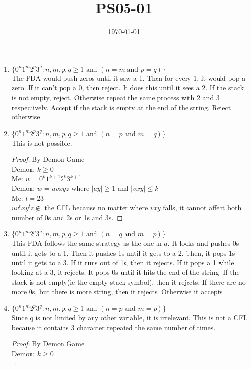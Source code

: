 \documentclass{article}
\title{PS05-01}
\date{\today}
\begin{document}
\maketitle
\begin{enumerate}[label=\alph*.]
\item $\{0^n1^m2^p3^q :n,m,p,q \geq 1 \text{ and } (n=m \text{ and } p= q)\}$\\
The PDA would push zeros until it saw a 1. Then for every 1, it would pop a zero. If it can't pop a 0, then reject. It does this until it sees a 2. If the stack is not empty, reject. Otherwise repeat the same process with 2 and 3 respectively. Accept if the stack is empty at the end of the string. Reject otherwise
\item $\{0^n1^m2^p3^q :n,m,p,q \geq 1 \text{ and } (n=p \text{ and } m= q)\}$\\
This is not possible.
\begin{proof}
By Demon Game\\
Demon: $k \geq 0$\\
Me: $w = 0^k1^{k+1}2^k3^{k+1}$\\
Demon: $w = uvxyz$ where $\lvert uy\rvert \geq 1$ and $\lvert vxy\rvert \leq k$\\
Me: $t = 23$\\$uv^txy^tz \notin $ the CFL because no matter where $vxy$ falls, it cannot affect both number of 0s and 2s or 1s and 3s.
\end{proof}
\item $\{0^n1^m2^p3^q :n,m,p,q \geq 1 \text{ and } (n=q \text{ and } m=p)\}$\\
This PDA follows the same strategy as the one in $a$. It looks and pushes 0s until it gets to a 1. Then it pushes 1s until it gets to a 2. Then, it pops 1s until it gets to a 3. If it runs out of 1s, then it rejects. If it pops a 1 while looking at a 3, it rejects. It pops 0s until it hits the end of the string. If the stack is not empty(ie the empty stack symbol), then it rejects. If there are no more 0s, but there is more string, then it rejects. Otherwise it accepts 
\item $\{0^n1^m2^p3^q :n,m,p,q \geq 1 \text{ and } (n=p \text{ and } m=p)\}$\\
Since q is not limited by any other variable, it is irrelevant.
This is not a CFL because it contains 3 character repeated the same number of times.
\begin{proof}
By Demon Game\\
Demon: $k \geq 0$\\

\end{proof}
\end{enumerate}
\end{document}
